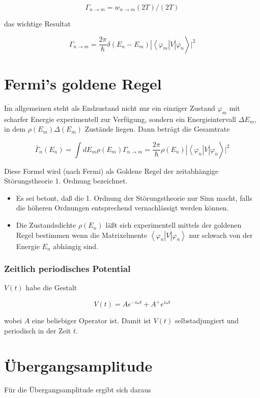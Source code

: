 \documentclass[10pt, letterpaper]{article}
\begin{document}
$$
\Gamma_{n \rightarrow m}=w_{n \rightarrow m}(2 T) /(2 T)
$$

das wichtige Resultat

$$
\left.\Gamma_{n \rightarrow m}=\frac{2 \pi}{\hbar} \delta\left(E_{n}-E_{m}\right)\left|\left\langle\varphi_{m}\right| V\right| \varphi_{n}\right\rangle\left.\right|^{2}
$$

\section*{Fermi's goldene Regel}
$\overline{\mathrm{Im}}$ allgemeinen steht als Endzustand nicht nur ein einziger Zustand $\varphi_{m}$ mit scharfer Energie experimentell zur Verfügung, sondern ein Energieintervall $\Delta E_{m}$, in dem $\rho\left(E_{m}\right) \Delta\left(E_{m}\right)$ Zustände liegen. Dann beträgt die Gesamtrate

$$
\left.\bar{\Gamma}_{n}\left(E_{n}\right)=\int d E_{m} \rho\left(E_{m}\right) \Gamma_{n \rightarrow m}=\frac{2 \pi}{\hbar} \rho\left(E_{n}\right)\left|\left\langle\varphi_{n}\right| V\right| \varphi_{n}\right\rangle\left.\right|^{2}
$$

Diese Formel wird (nach Fermi) als Goldene Regel der zeitabhängige Störungstheorie 1. Ordnung bezeichnet.

\begin{itemize}
  \item Es sei betont, daß die 1. Ordnung der Störungstheorie nur Sinn macht, falls die höheren Ordnungen entsprechend vernachlässigt werden können.
  \item Die Zustandsdichte $\rho\left(E_{n}\right)$ läßt sich experimentell mittels der goldenen Regel bestimmen wenn die Matrixelmente $\left\langle\varphi_{n}\right| V\left|\varphi_{n}\right\rangle$ nur schwach von der Energie $E_{n}$ abhängig sind.
\end{itemize}

\subsubsection*{Zeitlich periodisches Potential}
$V(t)$ habe die Gestalt

$$
V(t)=A e^{-i \omega t}+A^{+} e^{i \omega t}
$$

wobei $A$ eine beliebiger Operator ist. Damit ist $V(t)$ selbstadjungiert und periodisch in der Zeit $t$.

\section*{Übergangsamplitude}
Für die Übergangsamplitude ergibt sich daraus
\end{document}
